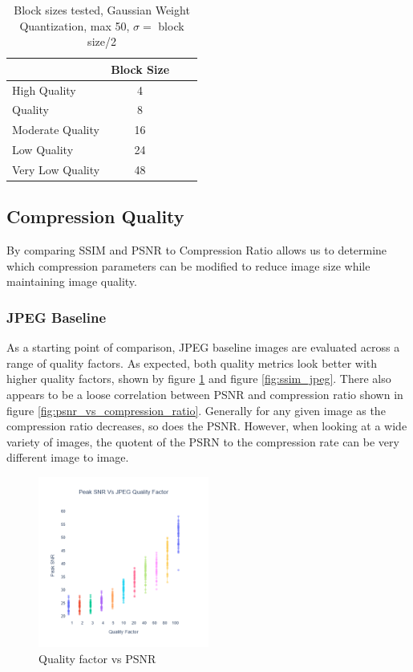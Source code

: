 \begin{table}[h!]
    \centering
    \caption{Block sizes tested, Gaussian Weight Quantization, max 50, $\sigma = $ block size/2}
    \begin{tabularx}{0.5\textwidth}{X c c c}
        \toprule
        \ & \textbf{Block Size} \\
        \midrule
        High Quality & 4 \\
        Quality & 8 \\
        Moderate Quality & 16 \\
        Low Quality & 24 \\
        Very Low Quality & 48 \\
        \bottomrule
    \end{tabularx}
    \label{tab:Block Size Sweep}
\end{table}

\subsection{Compression Quality}

By comparing SSIM and PSNR to Compression Ratio allows us to determine which compression parameters can be modified to reduce image size while maintaining image quality.

\subsubsection{JPEG Baseline}

As a starting point of comparison, JPEG baseline images are evaluated across a range of quality factors. As expected, both quality metrics look better with higher quality factors, shown by figure \ref{fig:psnr_jpeg} and figure \ref{fig:ssim_jpeg}.
There also appears to be a loose correlation between PSNR and compression ratio shown in figure \ref{fig:psnr_vs_compression_ratio}. Generally for any given image as the compression ratio decreases, so does the PSNR. However, when looking at a wide variety of images, the quotent of the PSRN to the compression rate can be very different image to image.

\begin{figure}
    \includegraphics[width=0.5\textwidth]{assets/JPEG Quality Factor and PSNR.png}
    \caption{Quality factor vs PSNR}
    \label{fig:psnr_jpeg}
\end{figure}

